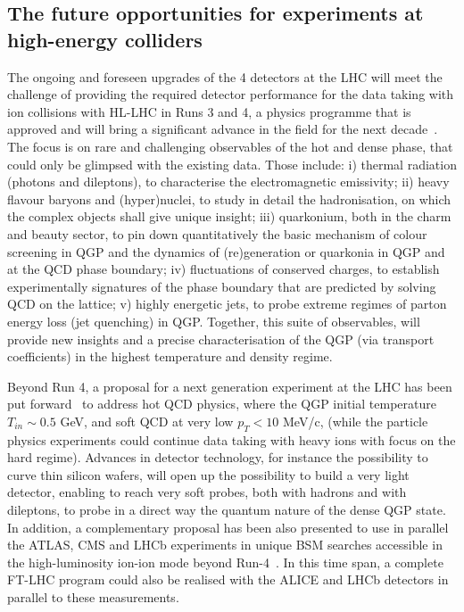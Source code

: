 \subsection{The future opportunities for experiments at high-energy colliders}

The ongoing and foreseen upgrades of the 4 detectors at the LHC will meet the challenge of providing the required detector performance for the data taking with ion collisions with HL-LHC in Runs 3 and 4, a physics programme that is approved and will bring a significant advance in the field for the next decade~\cite{Citron:2018lsq}. 
The focus is on rare and challenging observables of the hot and dense phase, that could only be glimpsed with the existing data. Those include:
i) thermal radiation (photons and dileptons), to characterise the electromagnetic emissivity;
ii) heavy flavour baryons  and (hyper)nuclei, to study in detail the hadronisation, on which the complex objects shall give unique insight; 
iii) quarkonium, both in the charm and beauty sector, to pin down quantitatively the basic mechanism of colour screening in QGP and the dynamics of (re)generation or quarkonia in QGP and at the QCD phase boundary;
iv) fluctuations of conserved charges, to establish experimentally signatures of the phase boundary that are predicted by solving QCD on the lattice;
v) highly energetic jets, to probe extreme regimes of parton energy loss (jet quenching) in QGP.
Together, this suite of observables, will provide new insights and a precise characterisation of the QGP (via transport coefficients) in the highest temperature and density regime. 

Beyond Run 4, a proposal for a next generation experiment at the LHC has been put forward~\cite{Adamova:2019vkf} to address hot QCD
physics, where the QGP initial temperature $T_{in}\sim 0.5$ GeV,   and soft  QCD   at very low $p_T< 10$  MeV/c, (while the particle physics experiments could continue data taking with heavy ions with focus on the hard regime). Advances in detector technology, for instance the possibility to curve thin silicon wafers, will open up the possibility to build a very light detector, enabling to reach very soft probes, both with hadrons and with dileptons, to probe in a direct way the quantum nature of the dense QGP state.
%
In addition, a complementary proposal has been
also presented to use in parallel the ATLAS, CMS and LHCb experiments in unique
BSM searches accessible in the high-luminosity ion-ion mode beyond
Run-4~\cite{Bruce:2018yzs}. In this time span, a complete FT-LHC program could also be realised with the ALICE and LHCb detectors in parallel to these measurements.

